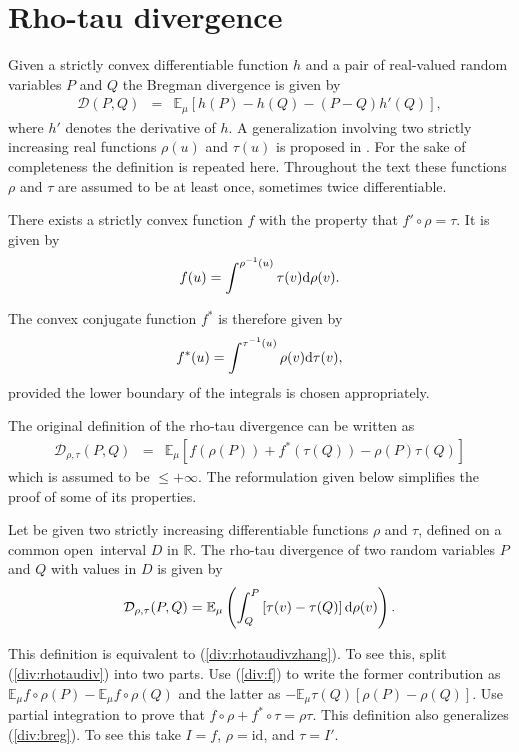\documentclass[graybox]{svmult}
\newcommand{\be}{\begin{equation}}
\newcommand{\ee}{\end{equation}}
\newcommand{\beq}{\begin{eqnarray}}
\newcommand{\eeq}{\end{eqnarray}}
\newcommand{\id}{\mbox{id}}
\newcommand{\Eo}{\mathbb E}
\newcommand{\Ro}{\mathbb R}
\newcommand{\Ddiv}{\mathcal{D}}
\newcommand{\upd}{{\rm d}}
\newcommand{\add}[1]{{\color{blue}#1}}
\newcommand{\remove}[1]{{\color{blue}{\st {#1}}}}
\newcommand{\change}[2]{\remove{#1}\,\add{#2}}
\begin{document}
\section{Rho-tau divergence}
\label{sect:rhotau}


Given a strictly convex differentiable function $h$ and a pair of real-valued
random variables $P$ and $Q$ the Bregman divergence \cite{bregman1967}
is given by
\beq
\Ddiv (P,Q)&=&\Eo_\mu\left[ h(P)-h(Q)-(P-Q)h'(Q)\right],
\label{div:breg}
\eeq
where $h'$ denotes the derivative of $h$.
A generalization involving two strictly increasing real functions $\rho(u)$ and $\tau(u)$
is proposed in \cite {zhang2004a}. For the sake of completeness the definition is repeated here.
Throughout the text these functions $\rho$ and $\tau$ are assumed to be at least once,
sometimes twice differentiable.


There exists a strictly convex function $f$ with the property that $f'\circ \rho=\tau$.
It is given by
\be
\label{div:f}
f(u)=\int^{\rho^{-1}(u)} \tau(v)\upd \rho(v).
\ee

The convex conjugate function $f^*$ is therefore given by
\be
f^*(u)=\int^{\tau^{-1}(u)}\rho(v)\upd\tau(v),
\label{div:fstar}
\ee
provided the lower boundary of the integrals is chosen appropriately.

The original definition \cite{zhang2004a} of the rho-tau divergence can be written as
\beq
\Ddiv _{\rho,\tau}(P,Q)&=&\Eo_\mu\left[
f(\rho(P))+f^*(\tau(Q))-\rho(P)\tau(Q)\right]
\label{div:rhotaudivzhang}
\eeq
which is assumed to be $\le +\infty.$ The reformulation given below simplifies the proof of some of its properties.

\begin{definition}
Let be given two strictly increasing differentiable functions $\rho$ and $\tau$,
defined on a common open \change{convex domain}{interval} $D$ in $\Ro$.
The rho-tau divergence  of two random variables $P$ and $Q$ with values in $D$ is given by
\be
\Ddiv _{\rho,\tau}(P,Q)=\Eo_\mu\left(\int_Q^P\left[\tau(v)-\tau(Q)\right]\upd \rho(v)\right).
\label{div:rhotaudiv}
\ee
\end{definition}

This definition is equivalent to (\ref  {div:rhotaudivzhang}). To see this, split (\ref {div:rhotaudiv})
into two parts.
Use (\ref {div:f}) to write the former contribution as $\Eo_\mu f\circ\rho(P)-\Eo_\mu f\circ\rho(Q)$
and the latter as $-\Eo_\mu\tau(Q)[\rho(P)-\rho(Q)]$. Use partial integration to prove
that $f\circ\rho+f^*\circ\tau=\rho\tau$.
%
This definition also generalizes (\ref {div:breg}). To see this take $I=f$, $\rho=\id$, and $\tau=I'$.
\end{document}
